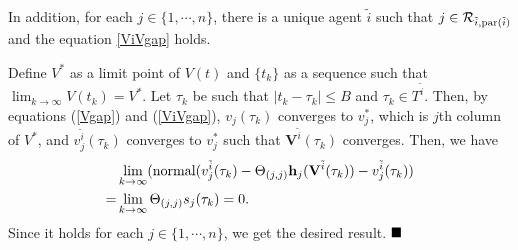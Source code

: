 \documentclass[journal]{IEEEtran}
\begin{document}
In addition, for each $j\in \{1,\cdots,n\}$, there is a unique agent $\tilde{i}$ such that $j\in \mathcal{R}_{\tilde{i},{\rm par}(\tilde{i})}$ and the equation \eqref{ViVgap} holds.
\par Define $V^*$ as a limit point of $V(t)$ and $\{t_k\}$ as a sequence such that $\lim_{k\to\infty}V(t_k)=V^*$. Let $\tau_k$ be such that $\left|t_k-\tau_k\right|\leq B$ and $\tau_k\in T^{\tilde{i}}$. Then, by equations (\ref{Vgap}) and (\ref{ViVgap}), $v_j(\tau_k)$  converges to $v_j^*$, which is $j$th column of $V^*$, and $v_j^{\tilde{i}}(\tau_k)$ converges to $v_j^*$ such that $\mathbf{V}^{\tilde{i}}(\tau_k)$ converges. Then, we have
\begin{align*}
&\lim_{k\to \infty}({\rm normal}(v_j^{\tilde{i}}(\tau_k)-\Theta_{(j,j)}\mathbf{h}_j(\mathbf{V}^{\tilde{i}}(\tau_k))-v_j^{\tilde{i}}(\tau_k))\\
=&\lim_{k\to \infty}\Theta_{(j,j)}s_j(\tau_k)=0.
\end{align*}%
Since it holds for each $j\in\{1,\cdots,n\}$, we get the desired result.
$\hfill\blacksquare$
\end{document}
